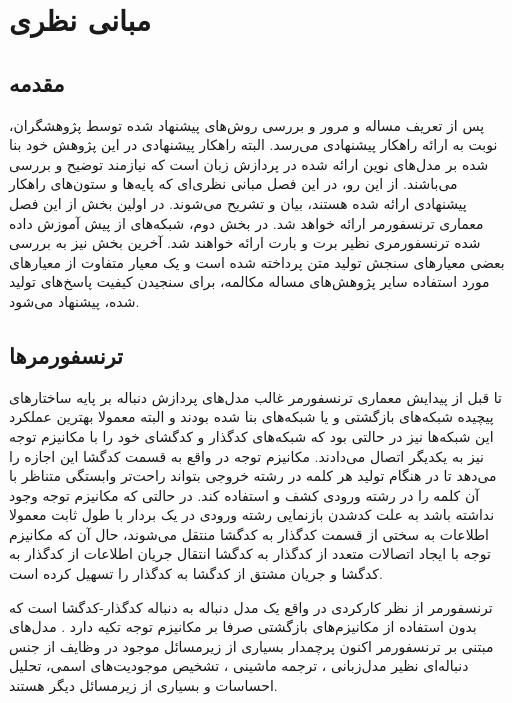 \chapter{مبانی نظری}\label{chap3}
\minitoc

\section{مقدمه}

پس از تعریف مساله و مرور و بررسی روش‌های پیشنهاد شده توسط پژوهشگران، نوبت به ارائه راهکار پیشنهادی می‌رسد. البته راهکار پیشنهادی در این پژوهش خود بنا شده بر مدل‌های نوین ارائه شده در پردازش زبان است که نیازمند توضیح و بررسی می‌باشند.
از این رو، در این فصل مبانی نظری‌ای که پایه‌ها و ستون‌های راهکار پیشنهادی ارائه شده هستند، بیان و تشریح می‌شوند. در اولین بخش از این فصل معماری ترنسفورمر ارائه خواهد شد. در بخش دوم، شبکه‌های از پیش آموزش داده شده ترنسفورمری نظیر برت و بارت ارائه خواهند شد. آخرین بخش نیز به بررسی بعضی معیارهای سنجش تولید متن پرداخته شده است و یک معیار متفاوت از معیارهای مورد استفاده سایر پژوهش‌های مساله مکالمه، برای سنجیدن کیفیت پاسخ‌های تولید شده، ‌پیشنهاد می‌شود. 

\section{ترنسفورمرها}

تا قبل از پیدایش معماری ترنسفورمر غالب مدل‌های پردازش دنباله بر پایه‌ ساختار‌های پیچیده شبکه‌های بازگشتی و یا شبکه‌های 
بنا شده بودند و البته معمولا بهترین عملکرد این شبکه‌ها نیز در حالتی بود که شبکه‌های کدگذار و کدگشای خود را با مکانیزم توجه نیز به یکدیگر اتصال می‌دادند. 
مکانیزم توجه در واقع به قسمت کدگشا این اجازه را می‌دهد تا در هنگام تولید هر کلمه در رشته خروجی بتواند راحت‌تر وابستگی متناظر با آن کلمه را در رشته ورودی کشف و استفاده کند. در حالتی که مکانیزم توجه وجود نداشته باشد به علت کدشدن بازنمایی رشته ورودی در یک بردار با طول ثابت معمولا اطلاعات به سختی از قسمت کدگذار به کدگشا منتقل می‌شوند، حال آن که مکانیزم توجه با ایجاد اتصالات متعدد از کدگذار به کدگشا انتقال جریان اطلاعات از کدگذار به کدگشا و جریان مشتق از کدگشا به کدگذار را تسهیل کرده است.

ترنسفورمر
از نظر کارکردی در واقع یک مدل دنباله به دنباله کدگذار-کدگشا است که بدون استفاده از مکانیزم‌های بازگشتی صرفا بر مکانیزم توجه تکیه دارد
\cite{transformer}
. مدل‌های مبتنی بر ترنسفورمر اکنون پرچمدار
بسیاری از زیرمسائل موجود در وظایف از جنس دنباله‌ای نظیر مدل‌زبانی
،
ترجمه ماشینی
، تشخیص موجودیت‌های اسمی، تحلیل احساسات
و بسیاری از زیرمسائل دیگر هستند.

